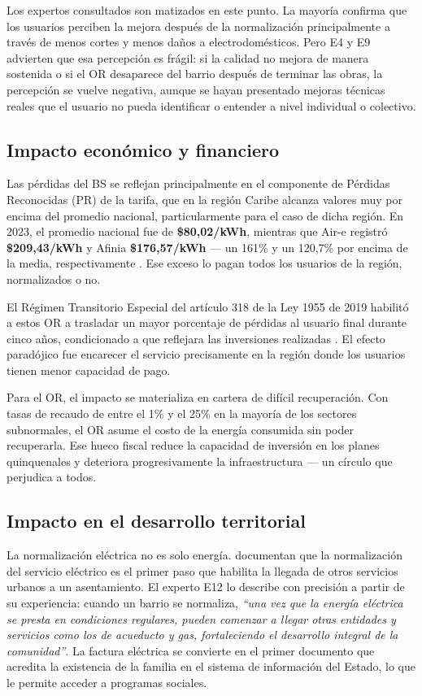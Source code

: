 Los expertos consultados son matizados en este punto. La mayoría confirma que los usuarios perciben la mejora después de la normalización principalmente a través de menos cortes y menos daños a electrodomésticos. Pero E4 y E9 advierten que esa percepción es frágil: si la calidad no mejora de manera sostenida o si el OR desaparece del barrio después de terminar las obras, la percepción se vuelve negativa, aunque se hayan presentado mejoras técnicas reales que el usuario no pueda identificar o entender a nivel individual o colectivo.

\subsection{Impacto económico y financiero}
\label{subsec:impacto_economico}

Las pérdidas del BS se reflejan principalmente en el componente de Pérdidas Reconocidas (PR) de la tarifa, que en la región Caribe alcanza valores muy por encima del promedio nacional, particularmente para el caso de dicha región. En 2023, el promedio nacional fue de \textbf{\$80,02/kWh}, mientras que Air-e registró \textbf{\$209,43/kWh} y Afinia \textbf{\$176,57/kWh} — un 161\% y un 120,7\% por encima de la media, respectivamente \parencite{UPME2025}. Ese exceso lo pagan todos los usuarios de la región, normalizados o no.

El Régimen Transitorio Especial del artículo 318 de la Ley 1955 de 2019 habilitó a estos OR a trasladar un mayor porcentaje de pérdidas al usuario final durante cinco años, condicionado a que reflejara las inversiones realizadas \parencite{Ley1955_2019}. El efecto paradójico fue encarecer el servicio precisamente en la región donde los usuarios tienen menor capacidad de pago.

Para el OR, el impacto se materializa en cartera de difícil recuperación. Con tasas de recaudo de entre el 1\% y el 25\% en la mayoría de los sectores subnormales, el OR asume el costo de la energía consumida sin poder recuperarla. Ese hueco fiscal reduce la capacidad de inversión en los planes quinquenales y deteriora progresivamente la infraestructura — un círculo que perjudica a todos.

\subsection{Impacto en el desarrollo territorial}
\label{subsec:impacto_territorial}

La normalización eléctrica no es solo energía. \textcite{MosqueraNoguera2005} documentan que la normalización del servicio eléctrico es el primer paso que habilita la llegada de otros servicios urbanos a un asentamiento. El experto E12 lo describe con precisión a partir de su experiencia: cuando un barrio se normaliza, \textit{``una vez que la energía eléctrica se presta en condiciones regulares, pueden comenzar a llegar otras entidades y servicios como los de acueducto y gas, fortaleciendo el desarrollo integral de la comunidad''}. La factura eléctrica se convierte en el primer documento que acredita la existencia de la familia en el sistema de información del Estado, lo que le permite acceder a programas sociales.


